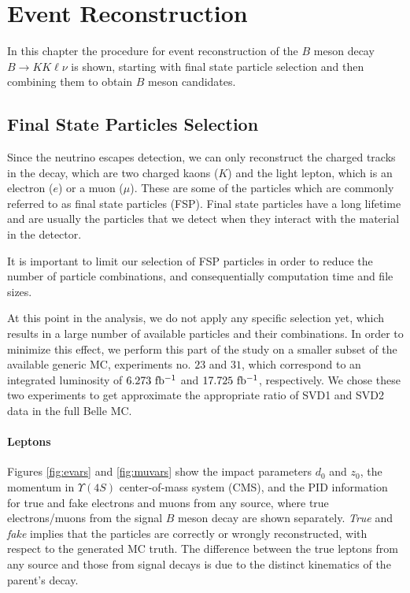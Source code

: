 \chapter{Event Reconstruction}

In this chapter the procedure for event reconstruction of the $B$ meson decay $B \to K K \ell \nu$ is shown, starting with final state particle selection and then combining them to obtain $B$ meson candidates.

\section{Final State Particles Selection}
Since the neutrino escapes detection, we can only reconstruct the charged tracks in the decay, which are two charged kaons ($K$) and the light lepton, which is an electron ($e$) or a muon ($\mu$). These are some of the particles which are commonly referred to as final state particles (FSP). Final state particles have a long lifetime and are usually the particles that we detect when they interact with the material in the detector.

It is important to limit our selection of FSP particles in order to reduce the number of particle combinations, and consequentially computation time and file sizes.

At this point in the analysis, we do not apply any specific selection yet, which results in a large number of available particles and their combinations. In order to minimize this effect, we perform this part of the study on a smaller subset of the available generic MC, experiments no. $23$ and $31$, which correspond to an integrated luminosity of $6.273\mathrm{~fb^{-1}}$ and $17.725\mathrm{~fb^{-1}}$, respectively. We chose these two experiments to get approximate the appropriate ratio of SVD1 and SVD2 data in the full Belle MC.

\subsubsection{Leptons}

Figures \ref{fig:evars} and \ref{fig:muvars} show the impact parameters $d_0$ and $z_0$, the momentum in  $\Upsilon(4S)$ center-of-mass system (CMS), and the PID information for true and fake electrons and muons from any source, where true electrons/muons from the signal $B$ meson decay are shown separately. \textit{True} and \textit{fake} implies that the particles are correctly or wrongly reconstructed, with respect to the generated MC truth. The difference between the true leptons from any source and those from signal decays is due to the distinct kinematics of the parent's decay.

